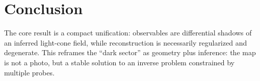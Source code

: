 \documentclass[11pt]{article}
\begin{document}
\section{Conclusion}
The core result is a compact unification: observables are differential shadows of an inferred light-cone field, while reconstruction is necessarily regularized and degenerate. This reframes the ``dark sector'' as geometry plus inference: the map is not a photo, but a stable solution to an inverse problem constrained by multiple probes.
\end{document}
